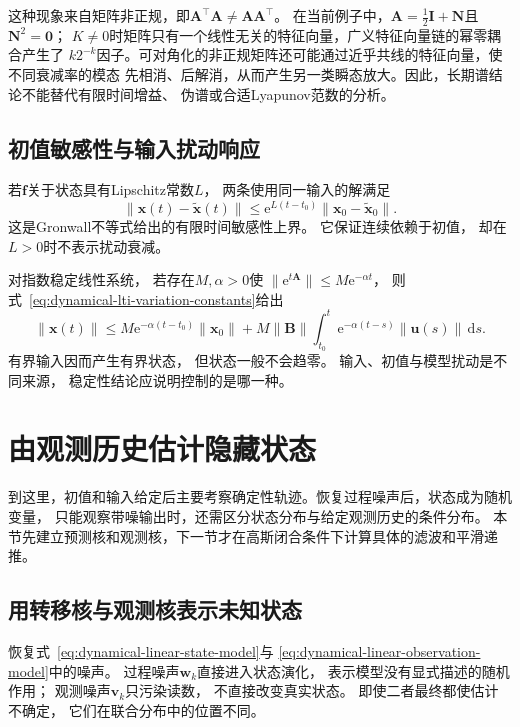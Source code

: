 这种现象来自矩阵非正规，即$\bm{A}^{\top}\bm{A}\neq\bm{A}\bm{A}^{\top}$。
在当前例子中，$\bm{A}=\tfrac12\bm{I}+\bm{N}$且$\bm{N}^2=\bm{0}$；
$K\neq0$时矩阵只有一个线性无关的特征向量，广义特征向量链的幂零耦合产生了
$k2^{-k}$因子。可对角化的非正规矩阵还可能通过近乎共线的特征向量，使不同衰减率的模态
先相消、后解消，从而产生另一类瞬态放大。因此，长期谱结论不能替代有限时间增益、
伪谱或合适Lyapunov范数的分析。

\subsection{初值敏感性与输入扰动响应}

若$\bm{f}$关于状态具有Lipschitz常数$L$， 两条使用同一输入的解满足
\[
	\lVert\bm{x}(t)-\widetilde{\bm{x}}(t)\rVert \leq \mathrm{e}^{L(t-t_0)}\lVert\bm
	{x}_{0}-\widetilde{\bm{x}}_{0}\rVert.
\]
这是Gronwall不等式给出的有限时间敏感性上界。 它保证连续依赖于初值， 却在$L>0$时不表示扰动衰减。

对指数稳定线性系统， 若存在$M,\alpha>0$使
$\lVert\mathrm{e}^{t\bm{A}}\rVert\leq M \mathrm{e}^{-\alpha t}$， 则式~\eqref{eq:dynamical-lti-variation-constants}给出
\[
	\lVert\bm{x}(t)\rVert \leq M\mathrm{e}^{-\alpha(t-t_0)}\lVert\bm{x}_{0}\rVert+ M
	\lVert\bm{B}\rVert \int_{t_0}^{t}\mathrm{e}^{-\alpha(t-s)}\lVert\bm{u}(s)\rVert
	\,\mathrm{d}s.
\]
有界输入因而产生有界状态， 但状态一般不会趋零。 输入、初值与模型扰动是不同来源， 稳定性结论应说明控制的是哪一种。

\section{由观测历史估计隐藏状态}
\label{sec:dynamical-stochastic-state-observation}

到这里，初值和输入给定后主要考察确定性轨迹。恢复过程噪声后，状态成为随机变量，
只能观察带噪输出时，还需区分状态分布与给定观测历史的条件分布。
本节先建立预测核和观测核，下一节才在高斯闭合条件下计算具体的滤波和平滑递推。

\subsection{用转移核与观测核表示未知状态}

恢复式~\eqref{eq:dynamical-linear-state-model}与 \eqref{eq:dynamical-linear-observation-model}中的噪声。
过程噪声$\bm{w}_{k}$直接进入状态演化， 表示模型没有显式描述的随机作用； 观测噪声$\bm
{v}_{k}$只污染读数， 不直接改变真实状态。 即使二者最终都使估计不确定，
它们在联合分布中的位置不同。

